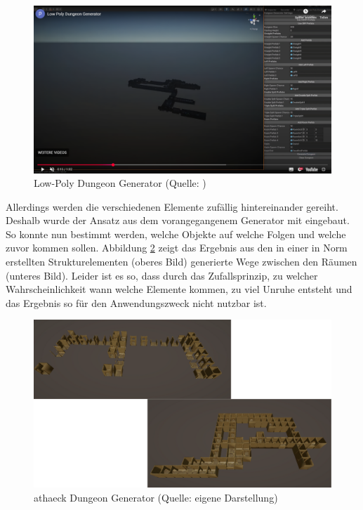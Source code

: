 \begin{figure}[ht]
\centering
\includegraphics[width=1\linewidth]{content/pictures/FirstSteps03.png}
\caption{Low-Poly Dungeon Generator (Quelle: \cite{past12pm_low_2024})}
\label{fig:dungeon-generator}
\end{figure}

Allerdings werden die verschiedenen Elemente zufällig hintereinander gereiht. Deshalb wurde der Ansatz aus dem vorangegangenem Generator mit eingebaut. So konnte nun bestimmt werden, welche Objekte auf welche Folgen und welche zuvor kommen sollen. Abbildung \ref{fig:athaeck-dungeon-generator} zeigt das Ergebnis aus den in einer in Norm erstellten Strukturelementen (oberes Bild) generierte Wege zwischen den Räumen (unteres Bild). Leider ist es so, dass durch das Zufallsprinzip, zu welcher Wahrscheinlichkeit wann welche Elemente kommen, zu viel Unruhe entsteht und das Ergebnis so für den Anwendungszweck nicht nutzbar ist.

\begin{figure}[ht]
\centering
\includegraphics[width=1\linewidth]{content/pictures/FirstSteps06.png}
\caption{athaeck Dungeon Generator (Quelle: eigene Darstellung)}
\label{fig:athaeck-dungeon-generator}
\end{figure}

